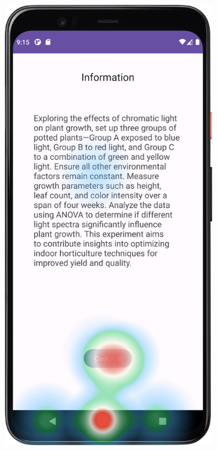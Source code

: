 \begin{figure}[htbp]
    \centering
    \begin{subfigure}[b]{0.25\textwidth}
        \centering
        \includegraphics[width=\textwidth]{content/07_evaluation_of_the_solution/HeatMap_InfoScreen.png}

\end{subfigure}
\end{figure}
